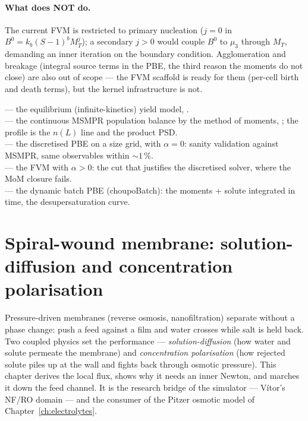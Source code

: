 \documentclass[11pt,a4paper]{article}
\begin{document}
\paragraph{What does NOT do.}  The current FVM is restricted to
primary nucleation ($j = 0$ in $B^0 = k_b (S{-}1)^b M_T^j$); a secondary
$j > 0$ would couple $B^0$ to $\mu_3$ through $M_T$, demanding an inner
iteration on the boundary condition.  Agglomeration and breakage
(integral source terms in the PBE, the third reason the moments do not
close) are also out of scope --- the FVM scaffold is ready for them
(per-cell birth and death terms), but the kernel infrastructure is
not.

\begin{tutoriallink}
 --- the equilibrium
(infinite-kinetics) yield model, . \\
 --- the continuous MSMPR
population balance by the method of moments, ; the
profile is the $n(L)$ line and the product PSD. \\
 --- the
discretised PBE on a size grid,  with $\alpha = 0$:
sanity validation against MSMPR, same observables within $\sim 1\,\%$. \\
 --- the
FVM with $\alpha > 0$: the cut that justifies the discretised solver,
where the MoM closure fails. \\
 --- the dynamic batch PBE
(choupoBatch): the moments + solute integrated in time, the
desupersaturation curve.
\end{tutoriallink}

\section{Spiral-wound membrane: solution-diffusion and concentration
polarisation}\label{ch:membrane}

\begin{whatyoulllearn}
Pressure-driven membranes (reverse osmosis, nanofiltration) separate
without a phase change: push a feed against a film and water crosses
while salt is held back.  Two coupled physics set the performance ---
\emph{solution-diffusion} (how water and solute permeate the membrane)
and \emph{concentration polarisation} (how rejected solute piles up at
the wall and fights back through osmotic pressure).  This chapter
derives the local flux, shows why it needs an inner Newton, and marches
it down the feed channel.  It is the research bridge of the simulator
--- Vítor's NF/RO domain --- and the consumer of the Pitzer osmotic
model of Chapter~\ref{ch:electrolytes}.
\end{whatyoulllearn}
\end{document}
